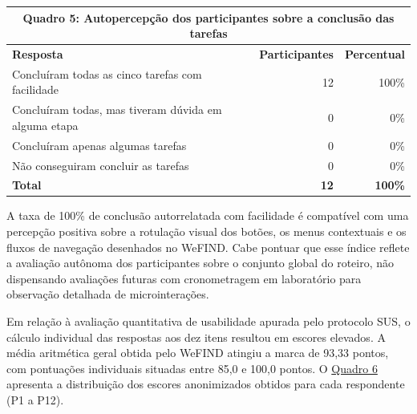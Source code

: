 \begin{table}[H]
    \centering
    \hypertarget{quadro:conclusao_tarefas}{}\label{quadro:conclusao_tarefas}
    \small
    \renewcommand{\arraystretch}{1.15}
    \begin{tabular}{|p{8.4cm}|r|r|}
        \hline
        \multicolumn{3}{|c|}{\textbf{Quadro 5: Autopercepção dos participantes sobre a conclusão das tarefas}} \\ \hline
        \textbf{Resposta} & \textbf{Participantes} & \textbf{Percentual} \\ \hline
        Concluíram todas as cinco tarefas com facilidade & 12 & 100\% \\ \hline
        Concluíram todas, mas tiveram dúvida em alguma etapa & 0 & 0\% \\ \hline
        Concluíram apenas algumas tarefas & 0 & 0\% \\ \hline
        Não conseguiram concluir as tarefas & 0 & 0\% \\ \hline
        \textbf{Total} & \textbf{12} & \textbf{100\%} \\ \hline
    \end{tabular}
\end{table}

A taxa de 100\% de conclusão autorrelatada com facilidade é compatível com uma percepção positiva sobre a rotulação visual dos botões, os menus contextuais e os fluxos de navegação desenhados no WeFIND. Cabe pontuar que esse índice reflete a avaliação autônoma dos participantes sobre o conjunto global do roteiro, não dispensando avaliações futuras com cronometragem em laboratório para observação detalhada de microinterações.

Em relação à avaliação quantitativa de usabilidade apurada pelo protocolo SUS, o cálculo individual das respostas aos dez itens resultou em escores elevados. A média aritmética geral obtida pelo WeFIND atingiu a marca de 93,33 pontos, com pontuações individuais situadas entre 85,0 e 100,0 pontos. O \hyperref[quadro:escores_sus]{Quadro 6} apresenta a distribuição dos escores anonimizados obtidos para cada respondente (P1 a P12).

